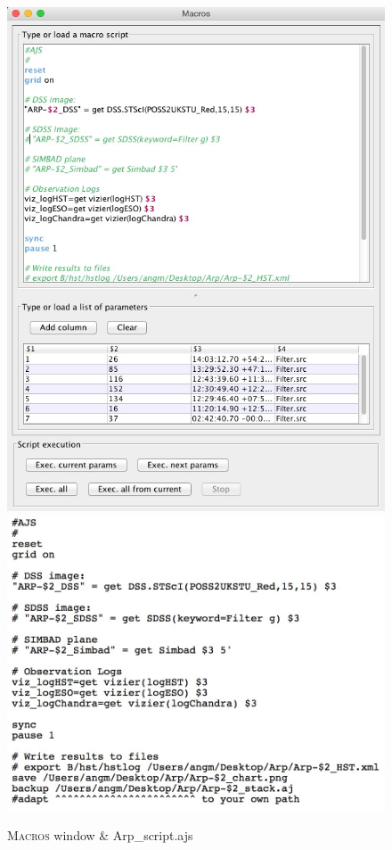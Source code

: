 \documentclass [a4paper, 12pt]{article}
\begin{document}
\begin{figure}[H]
\center
\includegraphics[width=0.38 
\textwidth]{../images/aladin_macrocontroller_cdstutorial.jpg}\hspace{0.3cm}\includegraphics[width=0.6
\textwidth]{../images/aladin_script_arp.jpg}
\caption{\textsc{Macros} window \& Arp\_script.ajs }
\label{fig:script}
\end{figure}

%
\end{document}
